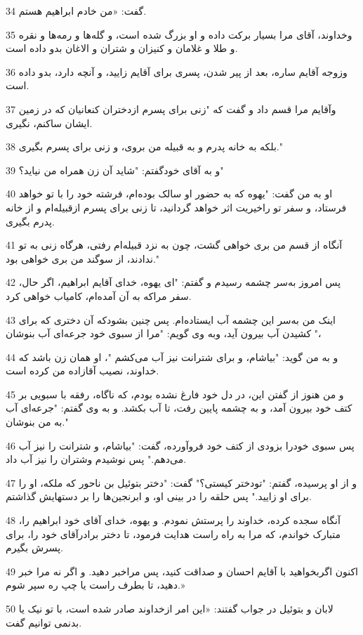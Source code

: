 \par 34 گفت: «من خادم ابراهیم هستم.
\par 35 وخداوند، آقای مرا بسیار برکت داده و او بزرگ شده است، و گله‌ها و رمه‌ها و نقره و طلا و غلامان و کنیزان و شتران و الاغان بدو داده است.
\par 36 وزوجه آقایم ساره، بعد از پیر شدن، پسری برای آقایم زایید، و آنچه دارد، بدو داده است.
\par 37 وآقایم مرا قسم داد و گفت که "زنی برای پسرم ازدختران کنعانیان که در زمین ایشان ساکنم، نگیری.
\par 38 بلکه به خانه پدرم و به قبیله من بروی، و زنی برای پسرم بگیری."
\par 39 و به آقای خودگفتم: "شاید آن زن همراه من نیاید؟"
\par 40 او به من گفت: "یهوه که به حضور او سالک بوده‌ام، فرشته خود را با تو خواهد فرستاد، و سفر تو راخیریت اثر خواهد گردانید، تا زنی برای پسرم ازقبیله‌ام و از خانه پدرم بگیری.
\par 41 آنگاه از قسم من بری خواهی گشت، چون به نزد قبیله‌ام رفتی، هرگاه زنی به تو ندادند، از سوگند من بری خواهی بود."
\par 42 پس امروز به‌سر چشمه رسیدم و گفتم: "ای یهوه، خدای آقایم ابراهیم، اگر حال، سفر مراکه به آن آمده‌ام، کامیاب خواهی کرد.
\par 43 اینک من به‌سر این چشمه آب ایستاده‌ام. پس چنین بشودکه آن دختری که برای کشیدن آب بیرون آید، وبه وی گویم: "مرا از سبوی خود جرعه‌ای آب بنوشان "،
\par 44 و به من گوید: "بیاشام، و برای شترانت نیز آب می‌کشم "، او همان زن باشد که خداوند، نصیب آقازاده من کرده است.
\par 45 و من هنوز از گفتن این، در دل خود فارغ نشده بودم، که ناگاه، رفقه با سبویی بر کتف خود بیرون آمد، و به چشمه پایین رفت، تا آب بکشد. و به وی گفتم: "جرعه‌ای آب به من بنوشان."
\par 46 پس سبوی خودرا بزودی از کتف خود فروآورده، گفت: "بیاشام، و شترانت را نیز آب می‌دهم." پس نوشیدم وشتران را نیز آب داد.
\par 47 و از او پرسیده، گفتم: "تودختر کیستی؟" گفت: "دختر بتوئیل بن ناحور که ملکه، او را برای او زایید." پس حلقه را در بینی او، و ابرنجین‌ها را بر دستهایش گذاشتم.
\par 48 آنگاه سجده کرده، خداوند را پرستش نمودم. و یهوه، خدای آقای خود ابراهیم را، متبارک خواندم، که مرا به راه راست هدایت فرمود، تا دختر برادرآقای خود را، برای پسرش بگیرم.
\par 49 اکنون اگربخواهید با آقایم احسان و صداقت کنید، پس مراخبر دهید. و اگر نه مرا خبر دهید، تا بطرف راست یا چپ ره سپر شوم.»
\par 50 لابان و بتوئیل در جواب گفتند: «این امر ازخداوند صادر شده است، با تو نیک یا بدنمی توانیم گفت.
